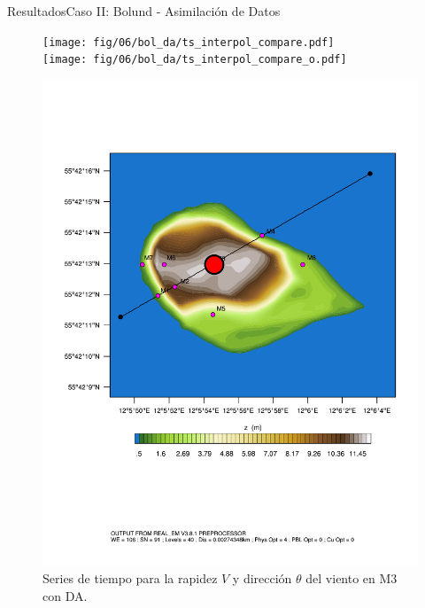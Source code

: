 \documentclass[mathserif,10pt]{beamer}
\begin{document}
\begin{frame}{Resultados}{Caso II: Bolund - Asimilación de Datos}
	\begin{figure}[H]
		\begin{minipage}{0.65\linewidth}
			\texttt{[image: fig/06/bol\_da/ts\_interpol\_compare.pdf]}\\%
			\texttt{[image: fig/06/bol\_da/ts\_interpol\_compare\_o.pdf]}%
		\end{minipage}%
		\begin{minipage}{0.35\linewidth}
			\centering
			\includegraphics[width=1\linewidth,page=1,trim={3.5cm 9.3cm 0.8cm 3.8cm},clip]{fig/05/ppt/bol_control_point3.pdf}%
		\end{minipage}%
		\vspace{-2mm}\caption{Series de tiempo para la rapidez $V$ y dirección $\theta$ del viento en M3 con DA.}
		\label{fig:06_bol_da_ts_m3}
	\end{figure}
\end{frame}
\end{document}
